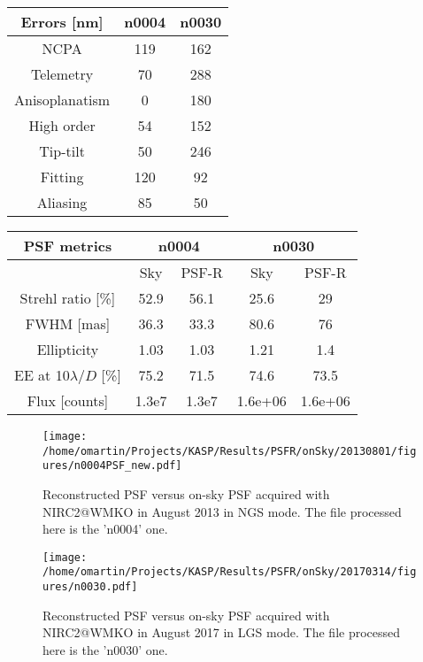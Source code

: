 \documentclass[12pt]{article}
\begin{document}
\begin{minipage}{0.4\columnwidth}
	\centering
	\begin{tabular}{|c|c|c|}
		\hline
		Errors [nm] & n0004 & n0030\\	
		\hline
		NCPA & 119& 162\\
		\hline
		Telemetry &70 & 288\\
		\hline
		Anisoplanatism &0& 180\\
		\hline
		High order & 54& 152\\
		\hline
		Tip-tilt & 50& 246\\	
		\hline
		Fitting & 120& 92\\
		\hline
		Aliasing & 85& 50\\
		\hline
	\end{tabular}
\label{T:errors}
\end{minipage}
\hspace{.25cm}
\begin{minipage}{0.6\columnwidth}
	\centering
	\begin{tabular}{|c|c|c|c|c|}
		\hline
		PSF metrics & \multicolumn{2}{c|}{n0004} & \multicolumn{2}{c|}{n0030} \\
		\hline
		 & Sky& PSF-R & Sky & PSF-R \\
		 \hline
		Strehl ratio [\%] &52.9 & 56.1 & 25.6&29\\
		\hline
		FWHM [mas] & 36.3& 33.3 &80.6 &76\\
		\hline
		Ellipticity & 1.03& 1.03& 1.21&1.4\\
		\hline
		EE at 10$\lambda/D$ [\%] & 75.2& 71.5& 74.6&73.5\\
		\hline
		Flux [counts] & 1.3e7& 1.3e7&1.6e+06 &1.6e+06\\	
		\hline
	\end{tabular}
\label{T:stats}
\end{minipage}

\begin{figure}[h!]
	\centering
	\texttt{[image: /home/omartin/Projects/KASP/Results/PSFR/onSky/20130801/figures/n0004PSF\_new.pdf]}
	\caption{Reconstructed PSF versus on-sky PSF acquired with NIRC2@WMKO in August 2013 in NGS mode. The file processed here is the 'n0004' one.}
	\label{F:n0004}
\end{figure}

\begin{figure}[h!]
	\centering
	\texttt{[image: /home/omartin/Projects/KASP/Results/PSFR/onSky/20170314/figures/n0030.pdf]}
		\caption{Reconstructed PSF versus on-sky PSF acquired with NIRC2@WMKO in August 2017 in LGS mode. The file processed here is the 'n0030' one.}
			\label{F:n0030}
\end{figure}
\end{document}
